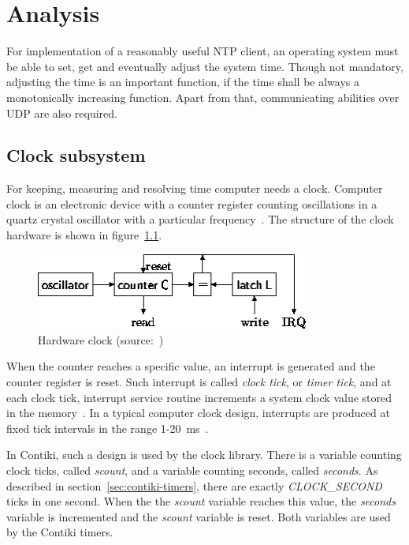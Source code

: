 
\chapter{Analysis}
For implementation of a reasonably useful NTP client,
an operating system must be able to set, get and eventually adjust the system time.
Though not mandatory, adjusting the time is an important function,
if the time shall be always a monotonically increasing function.
Apart from that, communicating abilities over UDP are also required.

\section{Clock subsystem}\label{sec:analysis-clock}
For keeping, measuring and resolving time computer needs a clock.
Computer clock is an electronic device with a counter register counting oscillations in a
quartz crystal oscillator with a particular frequency~\cite{thesis-sync}.
The structure of the clock hardware is shown in figure~\ref{fig:system-hardware-clock}.
\begin{figure}
  \centering
  \includegraphics[width=9cm,keepaspectratio]{fig/pc-clock.png}
  \caption{Hardware clock (source:~\cite{thesis-beat})}
  \label{fig:system-hardware-clock}
\end{figure}
When the counter reaches a specific value, an interrupt is generated and the counter register is reset.
Such interrupt is called {\it{clock tick}}, or {\it{timer tick}}, and at each clock tick,
interrupt service routine increments a system clock value stored in the memory~\cite{thesis-sync}.
In a typical computer clock design, interrupts are produced at
fixed tick intervals in the range 1-20~ms~\cite{nanokernel}.

In Contiki, such a design is used by the clock library.
There is a variable counting clock ticks, called {\it{scount}},
and a variable counting seconds, called {\it{seconds}}.
As described in section~\ref{sec:contiki-timers}, there are
exactly {\it{CLOCK\_SECOND}} ticks in one second.
When the the {\it{scount}} variable reaches this value,
the {\it{seconds}} variable is incremented and the {\it{scount}} variable is reset.
Both variables are used by the Contiki timers.

